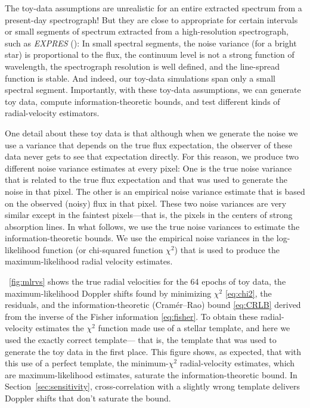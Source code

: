 \documentclass[modern]{aastex631}
\newcommand{\project}[1]{\textsl{#1}}
\newcommand{\sectionname}{Section}
\newcommand{\secref}[1]{\sectionname~\ref{#1}}
\newcommand{\figref}[1]{\figurename~\ref{#1}}
\begin{document}
The toy-data assumptions are unrealistic for an entire extracted spectrum from a present-day spectrograph!
But they are close to appropriate for certain intervals or small segments of spectrum extracted from a high-resolution spectrograph, such as \project{EXPRES} (\citealt{express}):
In small spectral segments, the noise variance (for a bright star) is proportional to the flux, the continuum level is not a strong function of wavelength, the spectrograph resolution is well defined, and the line-spread function is stable.
And indeed, our toy-data simulations span only a small spectral segment.
Importantly, with these toy-data assumptions, we can generate toy data, compute information-theoretic bounds, and test different kinds of radial-velocity estimators.

One detail about these toy data is that although when we generate the noise we use a variance that depends on the true flux expectation, the observer of these data never gets to see that expectation directly.
For this reason, we produce two different noise variance estimates at every pixel:
One is the true noise variance that is related to the true flux expectation and that was used to generate the noise in that pixel.
The other is an empirical noise variance estimate that is based on the observed (noisy) flux in that pixel.
These two noise variances are very similar except in the faintest pixels---that is, the pixels in the centers of strong absorption lines.
In what follows, we use the true noise variances to estimate the information-theoretic bounds.
We use the empirical noise variances in the log-likelihood function (or chi-squared function $\chi^2$) that is used to produce the maximum-likelihood radial velocity estimates.

\figref{fig:mlrvs} shows the true radial velocities for the 64 epochs of toy data, the maximum-likelihood Doppler shifts found by minimizing $\chi^2$ \eqref{eq:chi2}, the residuals, and the information-theoretic (Cram\'er--Rao) bound \eqref{eq:CRLB} derived from the inverse of the Fisher information \eqref{eq:fisher}.
To obtain these radial-velocity estimates the $\chi^2$ function made use of a stellar template, and here we used the exactly correct template--- that is, the template that was used to generate the toy data in the first place.
This figure shows, as expected, that with this use of a perfect template, the minimum-$\chi^2$ radial-velocity estimates, which are maximum-likelihood estimates, saturate the information-theoretic bound.
In \secref{sec:sensitivity}, cross-correlation with a slightly wrong template delivers Doppler shifts that don't saturate the bound.
\end{document}
